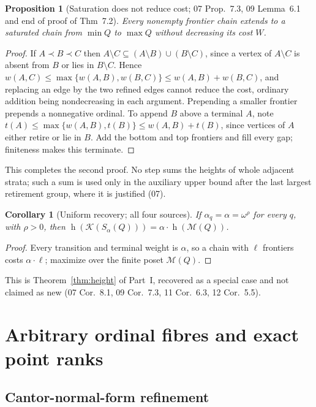 \documentclass[11pt,a4paper]{article}
\newtheorem{proposition}[theorem]{Proposition}
\newtheorem{corollary}[theorem]{Corollary}
\theoremstyle{definition}
\theoremstyle{remark}
\newcommand{\K}{\mathcal K}
\newcommand{\M}{\mathcal M}
\newcommand{\hgt}{\operatorname{h}}
\begin{document}
\begin{proposition}[Saturation does not reduce cost; 07 Prop.~7.3, 09 Lemma~6.1 and end of proof of Thm~7.2]
\label{nh:prop:saturation}
Every nonempty frontier chain extends to a saturated chain from $\min Q$ to
$\max Q$ without decreasing its cost $W$.
\end{proposition}
\begin{proof}
If $A\prec B\prec C$ then $A\setminus C\subseteq(A\setminus B)\cup(B\setminus C)$,
since a vertex of $A\setminus C$ is absent from $B$ or lies in $B\setminus C$.
Hence $w(A,C)\le\max\{w(A,B),w(B,C)\}\le w(A,B)+w(B,C)$, and replacing an edge
by the two refined edges cannot reduce the cost, ordinary addition being
nondecreasing in each argument. Prepending a smaller frontier prepends a
nonnegative ordinal. To append $B$ above a terminal $A$, note
$t(A)\le\max\{w(A,B),t(B)\}\le w(A,B)+t(B)$, since vertices of $A$ either retire
or lie in $B$. Add the bottom and top frontiers and fill every gap; finiteness
makes this terminate.
\end{proof}

This completes the second proof. No step sums the heights of whole adjacent
strata; such a sum is used only in the auxiliary upper bound after the last
largest retirement group, where it is justified (07).

\begin{corollary}[Uniform recovery; all four sources]\label{nh:cor:uniform}
If $\alpha_q=\alpha=\omega^\rho$ for every $q$, with $\rho>0$, then
$\hgt(\K(S_\alpha(Q)))=\alpha\cdot\hgt(\M(Q))$.
\end{corollary}
\begin{proof}
Every transition and terminal weight is $\alpha$, so a chain with $\ell$
frontiers costs $\alpha\cdot\ell$; maximize over the finite poset $\M(Q)$.
\end{proof}

This is Theorem~\ref{thm:height} of Part~I, recovered as a special case and not
claimed as new (07 Cor.~8.1, 09 Cor.~7.3, 11 Cor.~6.3, 12 Cor.~5.5).

\section{Arbitrary ordinal fibres and exact point ranks}\label{nh:sec:arbitrary}

\subsection{Cantor-normal-form refinement}
\end{document}
